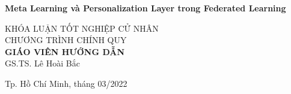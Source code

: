\begin{titlepage}
\begin{center}
    { \Large \bfseries Meta Learning và Personalization Layer trong Federated Learning\\[3cm]} 


    \large KHÓA LUẬN TỐT NGHIỆP CỬ NHÂN\\
    \large CHƯƠNG TRÌNH CHÍNH QUY\\[2cm]

    \textbf{GIÁO VIÊN HƯỚNG DẪN}\\
    GS.TS. Lê Hoài Bắc


    \vfill
    Tp. Hồ Chí Minh, tháng 03/2022

    \end{center}

\end{titlepage}